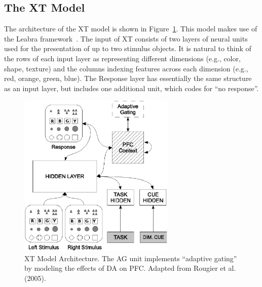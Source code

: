 \subsection{The XT Model} 


The architecture of the XT model is shown in Figure~\ref{xt-layout-figure}. This model makes use of the Leabra framework~\cite{OReillyRC:2000:Computational}. The input of XT consists of two layers of neural units used for the presentation of up to two stimulus objects. It is natural to think of the rows of each input layer as representing different dimensions (e.g., color, shape, texture) and the columns indexing features across each dimension (e.g., red, orange, green, blue). The Response layer has essentially the same structure as an input layer, but includes one additional unit, which codes for ``no response''.  

\begin{figure}
\begin{center}
	\includegraphics[width=75mm]{figures/xt_arch_2.ps}
\end{center}
\caption{XT Model Architecture. The AG unit implements ``adaptive gating'' 
	 by modeling the effects of DA on PFC. Adapted from Rougier et
         al. (2005).}
\label{xt-layout-figure}
\end{figure} 

